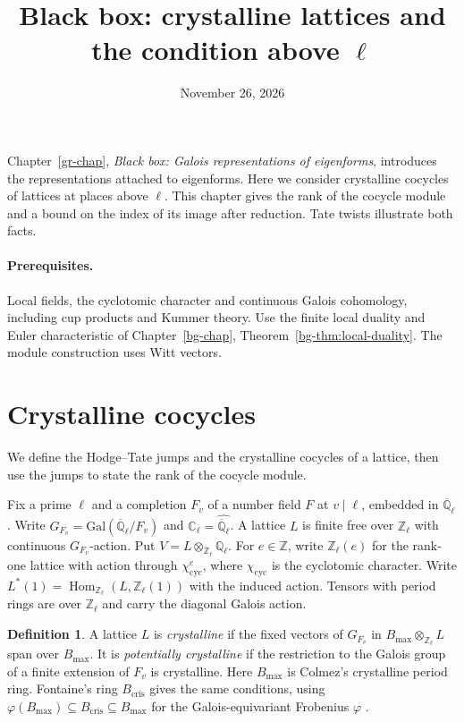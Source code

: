 \documentclass[reqno]{amsart}
\title{Black box: crystalline lattices and the condition above \texorpdfstring{\(\ell\)}{ell}}
\author{}
\date{November 26, 2026}
\newcounter{chap}
\theoremstyle{definition}
\newtheorem{definition}{Definition}[section]
\theoremstyle{plain}
\theoremstyle{remark}
\newcommand{\Z}{\mathbb Z}
\newcommand{\Q}{\mathbb Q}
\newcommand{\C}{\mathbb C}
\newcommand{\Bmax}{B_{\max}}
\newcommand{\Bcris}{B_{\mathrm{cris}}}
\begin{document}
\maketitle
{}\label{chap}

Chapter~\ref{gr-chap}, \emph{Black box: Galois representations of eigenforms},
introduces the representations attached to eigenforms. Here we consider
crystalline cocycles of lattices at places above \(\ell\). This chapter gives the rank of the cocycle module and a bound on the
index of its image after reduction. Tate twists illustrate both facts.

\paragraph{Prerequisites.}
Local fields, the cyclotomic character and continuous Galois cohomology,
including cup products and Kummer theory. Use the finite local duality
and Euler characteristic of Chapter~\ref{bg-chap},
Theorem~\ref{bg-thm:local-duality}. The module construction uses Witt vectors.

\section{Crystalline cocycles}\label{sec:cocycles}

We define the Hodge--Tate jumps and the crystalline cocycles of a lattice, then use the jumps to state the rank of the cocycle module.

Fix a prime \(\ell\) and a completion \(F_v\) of a number field \(F\) at \(v\mid\ell\), embedded
in \(\overline{\Q}_\ell\). Write \(G_{F_v}=\mathrm{Gal}(\overline{\Q}_\ell/F_v)\)
and \(\C_\ell=\widehat{\overline{\Q}_\ell}\).
A lattice \(L\) is finite free over \(\Z_\ell\) with continuous
\(G_{F_v}\)-action. Put \(V=L\otimes_{\Z_\ell}\Q_\ell\).
For \(e\in\Z\), write \(\Z_\ell(e)\) for the rank-one lattice with action through
\(\chi_{\mathrm{cyc}}^e\), where \(\chi_{\mathrm{cyc}}\) is the cyclotomic
character. Write \(L^*(1)=\operatorname{Hom}_{\Z_\ell}(L,\Z_\ell(1))\)
with the induced action. Tensors with period rings are over \(\Z_\ell\)
and carry the diagonal Galois action.

\begin{definition}\label{def:crystalline}
A lattice \(L\) is \emph{crystalline} if the fixed vectors of
\(G_{F_v}\) in \(\Bmax\otimes_{\Z_\ell}L\) span over \(\Bmax\).
It is \emph{potentially crystalline} if the restriction to the Galois
group of a finite extension of \(F_v\) is crystalline. Here \(\Bmax\)
is Colmez's crystalline period ring. Fontaine's ring \(\Bcris\) gives
the same conditions, using \(\varphi(\Bmax)\subseteq\Bcris\subseteq\Bmax\)
for the Galois-equivariant Frobenius \(\varphi\) \cite{Fo,Co}.
\end{definition}
\end{document}

